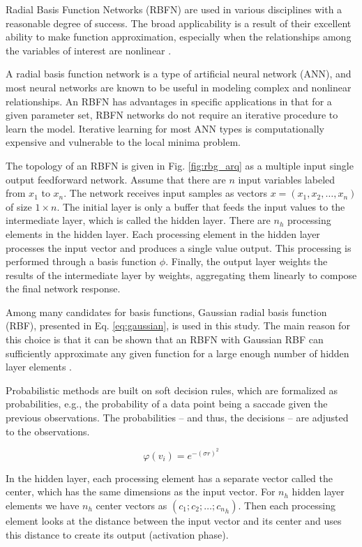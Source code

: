 \documentclass[preprint,12pt]{elsarticle}
\begin{document}
Radial Basis Function Networks (RBFN) are used in various disciplines with a reasonable degree of success. The broad applicability is a result of their excellent ability to make function approximation, especially when the relationships among the variables of interest are nonlinear \cite{Bishop:2006:PRM:1162264}.

A radial basis function network is a type of artificial neural network (ANN), and most neural networks are known to be useful in modeling complex and nonlinear relationships. An RBFN has advantages in specific applications in that for a given parameter set, RBFN networks do not require an iterative procedure to learn the model. Iterative learning for most ANN types is computationally expensive and vulnerable to the local minima problem.

The topology of an RBFN is given in Fig. \ref{fig:rbg_arq} as a multiple input single output feedforward network.
Assume that there are $n$ input variables labeled from $x_1$ to $x_n$.
The network receives input samples as vectors $x=(x_1, x_2, \ldots, x_n)$ of size $1 \times n$.
The initial layer is only a buffer that feeds the input values to the intermediate layer, which is called the hidden layer.
There are $n_h$ processing elements in the hidden layer.
Each processing element in the hidden layer processes the input vector and produces a single value output. This processing is performed through a basis function $\phi$.
Finally, the output layer weights the results of the intermediate layer by weights, aggregating them linearly to compose the final network response.

Among many candidates for basis functions, Gaussian radial basis function (RBF), presented in Eq. \ref{eq:gaussian}, is used in this study. The main reason for this choice is that it can be shown that an RBFN with Gaussian RBF can sufficiently approximate any given function for a large enough number of hidden layer elements \cite{Theodoridis:2008:PRF:1457541}.

Probabilistic methods are built on soft decision rules, which are formalized as probabilities, e.g.,  the probability of a data point being a saccade given the previous observations. The probabilities – and thus, the decisions – are adjusted to the observations.


\begin{equation}
    \label{eq:gaussian}
    \varphi (v_{i})=e^{-(\sigma r)^{2}}
\end{equation}

In the hidden layer, each processing element has a separate vector called the center, which has the same dimensions as the input vector.
For $n_h$ hidden layer elements we have $n_h$ center vectors as $(c_1; c_2; \ldots; {c_n}_h)$.
Then each processing element looks at the distance between the input vector and its center and uses this distance to create its output (activation phase).
\end{document}
